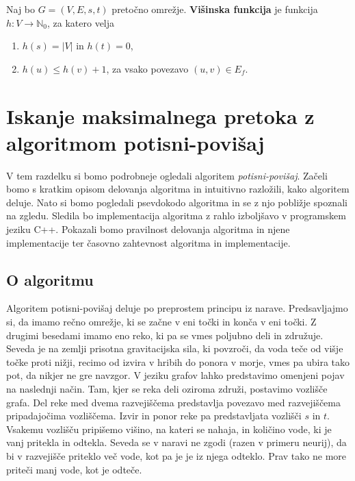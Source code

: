 \documentclass[mat1]{fmfdelo}
\newcommand{\N}{\mathbb N}
\begin{document}
\begin{definicija}\label{def:visinska_funkcija}
Naj bo $G=(V,E,s,t)$ pretočno omrežje. \textbf{Višinska funkcija} je funkcija $h\colon V \rightarrow \N_0$, za katero velja
\begin{enumerate}
\item $h(s) = |V|$ in $h(t) = 0$,
\item $h(u) \leq h(v) + 1$, za vsako povezavo $(u,v) \in E_f$.
\end{enumerate}
\end{definicija}








\section{Iskanje maksimalnega pretoka z algoritmom potisni-povišaj}

V tem razdelku si bomo podrobneje ogledali algoritem \textit{potisni-povišaj}. Začeli bomo s kratkim opisom delovanja algoritma in intuitivno razložili, kako algoritem deluje. Nato si bomo pogledali psevdokodo algoritma in se z njo pobližje spoznali na zgledu. Sledila bo implementacija algoritma z rahlo izboljšavo v programskem jeziku C++. Pokazali bomo pravilnost delovanja algoritma in njene implementacije ter časovno zahtevnost algoritma in implementacije.

\subsection{O algoritmu}
Algoritem potisni-povišaj deluje po preprostem principu iz narave. Predsavljajmo si, da imamo rečno omrežje, ki se začne v eni točki in konča v eni točki. Z drugimi besedami imamo eno reko, ki pa se vmes poljubno deli in združuje. Seveda je na zemlji prisotna gravitacijska sila, ki povzroči, da voda teče od višje točke proti nižji, recimo od izvira v hribih do ponora v morje, vmes pa ubira tako pot, da nikjer ne gre navzgor. V jeziku grafov lahko predstavimo omenjeni pojav na naslednji način. Tam, kjer se reka deli oziroma združi, postavimo vozlišče grafa. Del reke med dvema razvejiščema predstavlja povezavo med razvejiščema pripadajočima vozliščema. Izvir in ponor reke pa predstavljata vozlišči $s$ in $t$. Vsakemu vozlišču pripišemo višino, na kateri se nahaja, in količino vode, ki je vanj pritekla in odtekla. Seveda se v naravi ne zgodi (razen v primeru neurij), da bi v razvejišče priteklo več vode, kot pa je je iz njega odteklo. Prav tako ne more priteči manj vode, kot je odteče.
\end{document}
